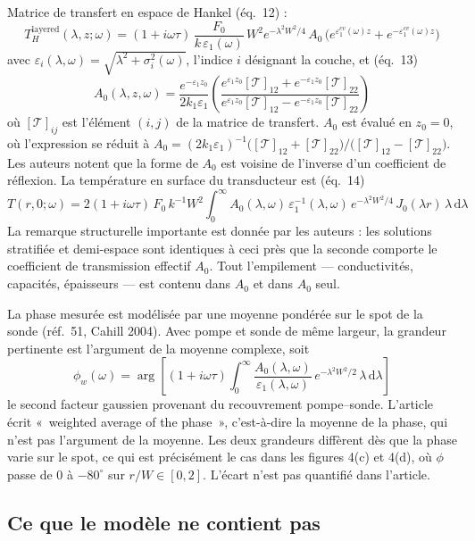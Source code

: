 \documentclass[11pt,a4paper]{article}
\begin{document}
Matrice de transfert en espace de Hankel (éq.~12) :
\[
T_H^{\text{layered}}(\lambda,z;\omega) = (1+i\omega\tau)\,\frac{F_0}{k\,\varepsilon_1(\omega)}\,
W^2 e^{-\lambda^2W^2/4}\,A_0\,
\big(e^{\varepsilon_1^{cv}(\omega)z} + e^{-\varepsilon_1^{cv}(\omega)z}\big)
\]
avec $\varepsilon_i(\lambda,\omega) = \sqrt{\lambda^2+\sigma_i^2(\omega)}$, l'indice $i$
désignant la couche, et (éq.~13)
\[
A_0(\lambda,z,\omega) = \frac{e^{-\varepsilon_1 z_0}}{2k_1\varepsilon_1}
\left(\frac{e^{\varepsilon_1 z_0}[\mathcal T]_{12} + e^{-\varepsilon_1 z_0}[\mathcal T]_{22}}
{e^{\varepsilon_1 z_0}[\mathcal T]_{12} - e^{-\varepsilon_1 z_0}[\mathcal T]_{22}}\right)
\]
où $[\mathcal T]_{ij}$ est l'élément $(i,j)$ de la matrice de transfert. $A_0$ est évalué en
$z_0 = 0$, où l'expression se réduit à
$A_0 = (2k_1\varepsilon_1)^{-1}\big([\mathcal T]_{12}+[\mathcal T]_{22}\big)
\big/\big([\mathcal T]_{12}-[\mathcal T]_{22}\big)$.
Les auteurs notent que la forme de $A_0$ est voisine de l'inverse d'un coefficient de réflexion.
La température en surface du transducteur est (éq.~14)
\[
T(r,0;\omega) = 2(1+i\omega\tau)\,F_0\,k^{-1}W^2 \int_0^\infty
A_0(\lambda,\omega)\,\varepsilon_1^{-1}(\lambda,\omega)\,e^{-\lambda^2W^2/4}\,
J_0(\lambda r)\,\lambda\,\mathrm{d}\lambda
\]
La remarque structurelle importante est donnée par les auteurs : les solutions stratifiée et
demi-espace sont identiques à ceci près que la seconde comporte le coefficient de transmission
effectif $A_0$. Tout l'empilement --- conductivités, capacités, épaisseurs --- est contenu dans
$A_0$ et dans $A_0$ seul.

La phase mesurée est modélisée par une moyenne pondérée sur le spot de la sonde (réf.~51,
Cahill 2004). Avec pompe et sonde de même largeur, la grandeur pertinente est l'argument de la
moyenne complexe, soit
\[
\phi_w(\omega) = \arg\!\left[(1+i\omega\tau)\int_0^\infty
\frac{A_0(\lambda,\omega)}{\varepsilon_1(\lambda,\omega)}\,e^{-\lambda^2W^2/2}\,
\lambda\,\mathrm{d}\lambda\right]
\]
le second facteur gaussien provenant du recouvrement pompe--sonde. L'article écrit «~weighted
average of the phase~», c'est-à-dire la moyenne de la phase, qui n'est pas l'argument de la
moyenne. Les deux grandeurs diffèrent dès que la phase varie sur le spot, ce qui est
précisément le cas dans les figures 4(c) et 4(d), où $\phi$ passe de $0$ à $-80^\circ$ sur
$r/W \in [0,2]$. L'écart n'est pas quantifié dans l'article.

\subsection{Ce que le modèle ne contient pas}
\end{document}
